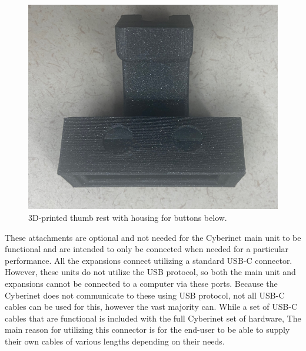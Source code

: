 \begin{center}
    \begin{figure}
        \centering
        \includegraphics[scale=0.1]{diagrams/builtUnits/buttonhousingEmpty.JPG}
        \caption{3D-printed thumb rest with housing for buttons below.}
        \label{fig:buttonThumbrest}
    \end{figure}
\end{center}

These attachments are optional and not needed for the Cyberinet main unit to be functional and are intended to only be connected when needed for a particular performance. All the expansions connect utilizing a standard USB-C connector. However, these units do not utilize the USB protocol, so both the main unit and expansions cannot be connected to a computer via these ports. Because the Cyberinet does not communicate to these using USB protocol, not all USB-C cables can be used for this, however the vast majority can. While a set of USB-C cables that are functional is included with the full Cyberinet set of hardware, The main reason for utilizing this connector is for the end-user to be able to supply their own cables of various lengths depending on their needs. 


